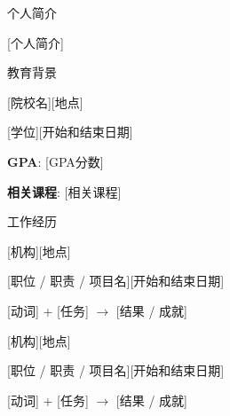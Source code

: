 \documentclass{xsha}
\begin{document}
\name{[姓], [名]}
\address{
\textbf{电话号码} [电话号码] $\cdot$\space
\textbf{电子邮箱} [电子邮箱] $\cdot$\space
\textbf{领英} \href{https://linkedin.com/in/[LinkedIn Username]/}{in/[领英用户名]}
}

\begin{xsection}{个人简介}

\item {[个人简介]}

\end{xsection}

\begin{xsection}{教育背景}

\begin{xheading1}{[院校名]}{[地点]}
\begin{xsubheading1}{[学位]}{[开始和结束日期]}
\item \textbf{GPA}: [GPA分数]
\item \textbf{相关课程}: [相关课程]
\end{xsubheading1}
\end{xheading1}

\end{xsection}

\begin{xsection}{工作经历}

\begin{xheading1}{[机构]}{[地点]}
\begin{xsubheading1}{[职位 / 职责 / 项目名]}{[开始和结束日期]}
\item {[动词] + [任务] $\rightarrow$ [结果 / 成就]}
\end{xsubheading1}
\end{xheading1}

\begin{xheading1}{[机构]}{[地点]}
\begin{xsubheading1}{[职位 / 职责 / 项目名]}{[开始和结束日期]}
\item {[动词] + [任务] $\rightarrow$ [结果 / 成就]}
\end{xsubheading1}
\end{xheading1}

\end{xsection}
\end{document}
